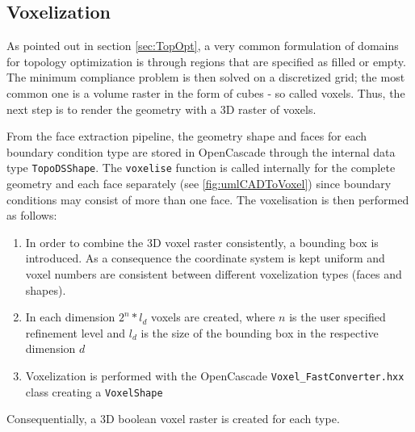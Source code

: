\subsection{Voxelization}
\label{sec: Voxelization}

As pointed out in section \ref{sec:TopOpt}, a very common formulation of domains for topology optimization is through regions that are specified as filled or empty. The minimum compliance problem is then solved on a discretized grid; the most common one is a volume raster in the form of cubes - so called voxels. Thus, the next step is to render the geometry with a 3D raster of voxels.

From the face extraction pipeline, the geometry shape and faces for each boundary condition type are stored in OpenCascade through the internal data type \lstinline|TopoDSShape|. The \lstinline|voxelise| function is called internally for the complete geometry and each face separately (see \autoref{fig:umlCADToVoxel}) since boundary conditions may consist of more than one face. The voxelisation is then performed as follows: 
\begin{enumerate}
\item In order to combine the 3D voxel raster consistently, a bounding box is introduced. As a consequence the coordinate system is kept uniform and voxel numbers are consistent between different voxelization types (faces and shapes). 
\item In each dimension $2^n*l_d$ voxels are created, where $n$ is the user specified refinement level and $l_d$ is the size of the bounding box in the respective dimension $d$
\item Voxelization is performed with the OpenCascade  \lstinline|Voxel_FastConverter.hxx| class creating a \lstinline|VoxelShape|
\end{enumerate}

Consequentially, a 3D boolean voxel raster is created for each type.
